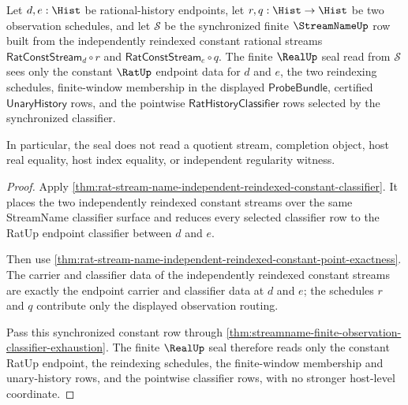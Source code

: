 \begin{theorem}
\label{thm:streamname-constant-reindexing-real-seal-boundary}
Let $d,e:\Hist$ be rational-history endpoints, let $r,q:\Hist\to\Hist$ be
two observation schedules, and let $\mathcal S$ be the synchronized finite
$\StreamNameUp$ row built from the independently reindexed constant rational
streams $\mathsf{RatConstStream}_d\circ r$ and
$\mathsf{RatConstStream}_e\circ q$. The finite $\RealUp$ seal read from
$\mathcal S$ sees only the constant $\RatUp$ endpoint data for $d$ and $e$,
the two reindexing schedules, finite-window membership in the displayed
$\mathsf{ProbeBundle}$, certified $\mathsf{UnaryHistory}$ rows, and the
pointwise $\mathsf{RatHistoryClassifier}$ rows selected by the synchronized
classifier.

In particular, the seal does not read a quotient stream, completion object,
host real equality, host index equality, or independent regularity witness.
\end{theorem}
\begin{proof}
Apply
\autoref{thm:rat-stream-name-independent-reindexed-constant-classifier}. It
places the two independently reindexed constant streams over the same
StreamName classifier surface and reduces every selected classifier row to
the RatUp endpoint classifier between $d$ and $e$.

Then use
\autoref{thm:rat-stream-name-independent-reindexed-constant-point-exactness}.
The carrier and classifier data of the independently reindexed constant
streams are exactly the endpoint carrier and classifier data at $d$ and $e$;
the schedules $r$ and $q$ contribute only the displayed observation routing.

Pass this synchronized constant row through
\autoref{thm:streamname-finite-observation-classifier-exhaustion}. The
finite $\RealUp$ seal therefore reads only the constant RatUp endpoint, the
reindexing schedules, the finite-window membership and unary-history rows,
and the pointwise classifier rows, with no stronger host-level coordinate.
\end{proof}

